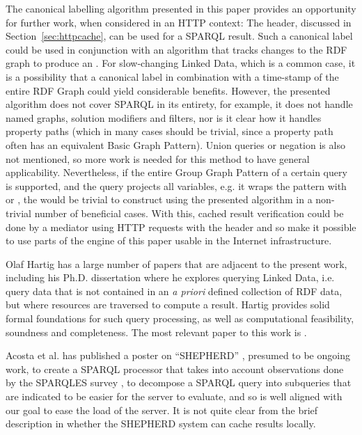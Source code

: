 The canonical labelling algorithm presented in this paper provides an
opportunity for further work, when considered in an HTTP context: The
 header, discussed in Section~\ref{sec:httpcache}, can be
used for a SPARQL result. Such a canonical label could be
used in conjunction with an algorithm that tracks changes to the RDF
graph to produce an . For slow-changing Linked Data, which
is a common case, it is a possibility that a canonical label in
combination with a time-stamp of the entire RDF Graph could yield
considerable benefits. However, the presented algorithm does not cover
SPARQL in its entirety, for example, it does not handle named graphs,
solution modifiers and filters, nor is it clear how it handles
property paths (which in many cases should be trivial, since a
property path often has an equivalent Basic Graph Pattern). Union
queries or negation is also not mentioned, so more work is needed for
this method to have general applicability. Nevertheless, if the entire
Group Graph Pattern of a certain query is supported, and the query
projects all variables, e.g. it wraps the pattern with  or , the  would be trivial to
construct using the presented algorithm in a non-trivial number of
beneficial cases. With this, cached result verification could be done
by a mediator using HTTP requests with the 
header and so make it possible to use parts of the engine of this
paper usable in the Internet infrastructure.

Olaf Hartig has a large number of papers that are adjacent to the
present work, including his Ph.D. dissertation \cite{hartig2014querying} where he
explores querying Linked Data, i.e. query data that is not contained
in an \textit{a priori} defined collection of RDF data, but where resources
are traversed to compute a result. Hartig provides solid formal
foundations for such query processing, as well as computational
feasibility, soundness and completeness. The most relevant paper to
this work is \cite{hartig2011caching}.

Acosta et al. has published a poster on ``SHEPHERD''
\cite{acosta2014shepherd}, presumed to be ongoing work, to
create a SPARQL processor that takes into account observations done by
the SPARQLES survey \cite{buil2013sparql}, to decompose a SPARQL query into
subqueries that are indicated to be easier for the server to evaluate,
and so is well aligned with our goal to ease the load of the
server. It is not quite clear from the brief description in 
\cite{acosta2014shepherd} whether the SHEPHERD system can cache results locally.

